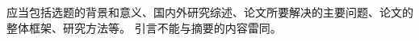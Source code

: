 

\begin{introduction}

应当包括选题的背景和意义、国内外研究综述、论文所要解决的主要问题、论文的整体框架、研究方法等。
引言不能与摘要的内容雷同。

\end{introduction}


